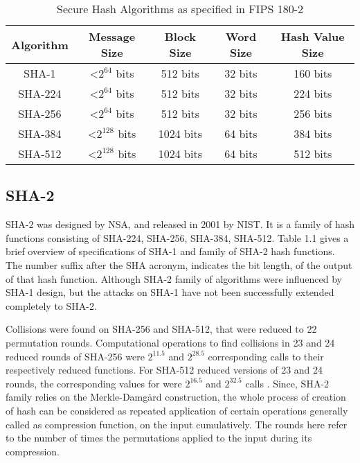   \begin{table}[h]
    \begin{center}
    \begin{tabular}{ *{5}{c} }
      \hline
      Algorithm & Message Size & Block Size & Word Size & Hash Value Size \\ \hline \hline
      SHA-1   & \textless $2^{64}$  bits & 512  bits & 32 bits & 160 bits \\   
      SHA-224 & \textless $2^{64}$  bits & 512  bits & 32 bits & 224 bits \\   
      SHA-256 & \textless $2^{64}$  bits & 512  bits & 32 bits & 256 bits \\   
      SHA-384 & \textless $2^{128}$ bits & 1024 bits & 64 bits & 384 bits \\   
      SHA-512 & \textless $2^{128}$ bits & 1024 bits & 64 bits & 512 bits \\
      \hline
    \end{tabular}
    \caption{ Secure Hash Algorithms as specified in FIPS 180-2} 
  \end{center}
  \end{table}

  \subsection{SHA-2}

  SHA-2 was designed by NSA, and released in 2001 by NIST. It is a family of hash functions consisting of 
  SHA-224, SHA-256, SHA-384, SHA-512. Table 1.1 gives a brief overview of specifications
  of SHA-1 and family of SHA-2 hash functions. The number suffix after the SHA acronym, 
  indicates the bit length, of the output of that hash function. Although SHA-2 family of algorithms
  were influenced by SHA-1 design, but the attacks on SHA-1 have not been successfully extended completely
  to SHA-2.

  Collisions were found on SHA-256 and SHA-512, that were reduced to 22 permutation rounds. Computational
  operations to find collisions in 23 and 24 reduced rounds of SHA-256 were $2^{11.5}$ and $2^{28.5}$ 
  corresponding calls to their respectively reduced functions. For SHA-512 reduced versions of 23 and 24 rounds, 
  the corresponding values for were $2^{16.5}$ and $2^{32.5}$ calls \cite{00012}.
  Since, SHA-2 family relies on the Merkle-Damg\.{a}rd construction, the whole
  process of creation of hash can be considered as repeated application of certain operations generally called
  as compression function, on the input cumulatively. The rounds here refer to the number of times the permutations
  applied to the input during its compression.

